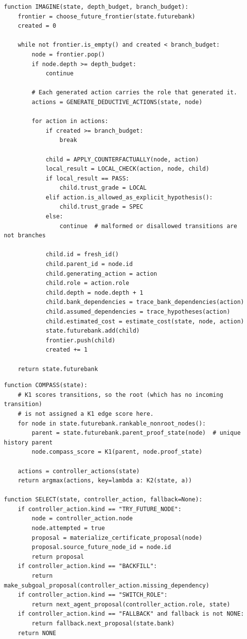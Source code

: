 \documentclass[11pt,openany]{book}
\theoremstyle{definition}
\theoremstyle{remark}
\begin{document}
\begin{lstlisting}[style=pseudo,caption={Graded imagination}]
function IMAGINE(state, depth_budget, branch_budget):
    frontier = choose_future_frontier(state.futurebank)
    created = 0

    while not frontier.is_empty() and created < branch_budget:
        node = frontier.pop()
        if node.depth >= depth_budget:
            continue

        # Each generated action carries the role that generated it.
        actions = GENERATE_DEDUCTIVE_ACTIONS(state, node)

        for action in actions:
            if created >= branch_budget:
                break

            child = APPLY_COUNTERFACTUALLY(node, action)
            local_result = LOCAL_CHECK(action, node, child)
            if local_result == PASS:
                child.trust_grade = LOCAL
            elif action.is_allowed_as_explicit_hypothesis():
                child.trust_grade = SPEC
            else:
                continue  # malformed or disallowed transitions are not branches

            child.id = fresh_id()
            child.parent_id = node.id
            child.generating_action = action
            child.role = action.role
            child.depth = node.depth + 1
            child.bank_dependencies = trace_bank_dependencies(action)
            child.assumed_dependencies = trace_hypotheses(action)
            child.estimated_cost = estimate_cost(state, node, action)
            state.futurebank.add(child)
            frontier.push(child)
            created += 1

    return state.futurebank
\end{lstlisting}

\begin{lstlisting}[style=pseudo,caption={Compass and controller}]
function COMPASS(state):
    # K1 scores transitions, so the root (which has no incoming transition)
    # is not assigned a K1 edge score here.
    for node in state.futurebank.rankable_nonroot_nodes():
        parent = state.futurebank.parent_proof_state(node)  # unique history parent
        node.compass_score = K1(parent, node.proof_state)

    actions = controller_actions(state)
    return argmax(actions, key=lambda a: K2(state, a))

function SELECT(state, controller_action, fallback=None):
    if controller_action.kind == "TRY_FUTURE_NODE":
        node = controller_action.node
        node.attempted = true
        proposal = materialize_certificate_proposal(node)
        proposal.source_future_node_id = node.id
        return proposal
    if controller_action.kind == "BACKFILL":
        return make_subgoal_proposal(controller_action.missing_dependency)
    if controller_action.kind == "SWITCH_ROLE":
        return next_agent_proposal(controller_action.role, state)
    if controller_action.kind == "FALLBACK" and fallback is not NONE:
        return fallback.next_proposal(state.bank)
    return NONE
\end{lstlisting}
\end{document}
